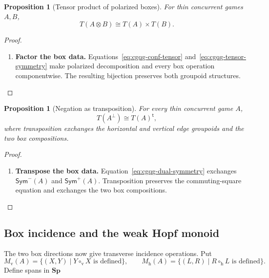 \documentclass[oneside]{article}
\newcommand{\Sym}{\mathsf{Sym}}
\newcommand{\Sp}{\mathbf{Sp}}
\theoremstyle{plain}
\newtheorem{proposition}[theorem]{Proposition}
\theoremstyle{definition}
\theoremstyle{remark}
\begin{document}
\begin{proposition}[Tensor product of polarized boxes]
\label{prop:cgqg-resource-tensor}
    For thin concurrent games \(A,B\),
    \[
        T(A\otimes B)\cong T(A)\times T(B).
    \]
\end{proposition}
\begin{proof}
    \leavevmode
    \begin{enumerate}[beginpenalty=10000]
        \item \textbf{Factor the box data.} Equations~\eqref{eq:cgqg-conf-tensor} and~\eqref{eq:cgqg-tensor-symmetry} make polarized decomposition and every box operation componentwise. The resulting bijection preserves both groupoid structures. \qedhere
    \end{enumerate}
\end{proof}

\begin{proposition}[Negation as transposition]
\label{prop:cgqg-resource-negation}
    For every thin concurrent game \(A\),
    \begin{equation}
        T(A^\perp)\cong T(A)^{\mathsf t},
    \label{eq:cgqg-resource-negation}
    \end{equation}
    where transposition exchanges the horizontal and vertical edge groupoids and the two box compositions.
\end{proposition}
\begin{proof}
    \leavevmode
    \begin{enumerate}[beginpenalty=10000]
        \item \textbf{Transpose the box data.} Equation~\eqref{eq:cgqg-dual-symmetry} exchanges \(\Sym^-(A)\) and \(\Sym^+(A)\). Transposition preserves the commuting-square equation and exchanges the two box compositions. \qedhere
    \end{enumerate}
\end{proof}

\subsection{Box incidence and the weak Hopf monoid}

The two box directions now give transverse incidence operations. Put
\[
    M_{\mathrm v}(A)=\{(X,Y)\mid Y\circ_{\mathrm v}X\text{ is defined}\},
    \qquad
    M_{\mathrm h}(A)=\{(L,R)\mid R\circ_{\mathrm h}L\text{ is defined}\}.
\]
Define spans in \(\Sp\)
\end{document}
